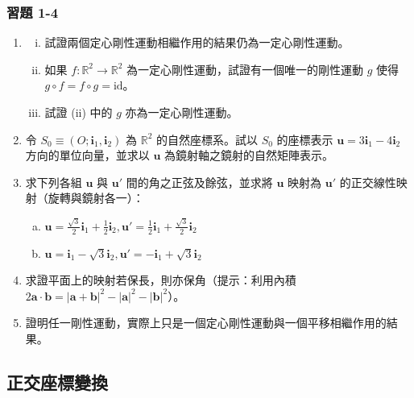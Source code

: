 \subsubsection*{習題 1-4}
\begin{enumerate}
  \item 
  \begin{enumerate}[(i)]
    \item 試證兩個定心剛性運動相繼作用的結果仍為一定心剛性運動。
    \item 如果 $f: \mathbb{R}^2 \to \mathbb{R}^2$ 為一定心剛性運動，試證有一個唯一的剛性運動 $g$ 使得 $g \circ f = f \circ g = \mathrm{id}$。
    \item 試證 (ii) 中的 $g$ 亦為一定心剛性運動。
  \end{enumerate}

  \item 令 $S_0 \equiv (O; \mathbf{i}_1, \mathbf{i}_2)$ 為 $\mathbb{R}^2$ 的自然座標系。試以 $S_0$ 的座標表示 $\mathbf{u} = 3\mathbf{i}_1 - 4\mathbf{i}_2$ 方向的單位向量，並求以 $\mathbf{u}$ 為鏡射軸之鏡射的自然矩陣表示。

  \item 求下列各組 $\mathbf{u}$ 與 $\mathbf{u}'$ 間的角之正弦及餘弦，並求將 $\mathbf{u}$ 映射為 $\mathbf{u}'$ 的正交線性映射（旋轉與鏡射各一）：
  \begin{enumerate}[a.]
    \item $\mathbf{u} = \frac{\sqrt{3}}{2}\mathbf{i}_1 + \frac{1}{2}\mathbf{i}_2, \mathbf{u}' = \frac{1}{2}\mathbf{i}_1 + \frac{\sqrt{3}}{2}\mathbf{i}_2$
    \item $\mathbf{u} = \mathbf{i}_1 - \sqrt{3}\mathbf{i}_2, \mathbf{u}' = -\mathbf{i}_1 + \sqrt{3}\mathbf{i}_2$
  \end{enumerate}

  \item 求證平面上的映射若保長，則亦保角（提示：利用內積 $2\mathbf{a} \cdot \mathbf{b} = |\mathbf{a} + \mathbf{b}|^2 - |\mathbf{a}|^2 - |\mathbf{b}|^2$）。

  \item 證明任一剛性運動，實際上只是一個定心剛性運動與一個平移相繼作用的結果。
\end{enumerate}
\subsection{正交座標變換}
\label{sec:b4s-1-5}

